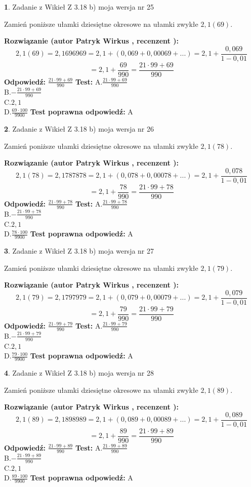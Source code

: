 \documentclass[12pt, a4paper]{article}
\theoremstyle{definition} %
\newtheorem{zad}{}
\newcommand{\zadStart}[1]{\begin{zad}#1\newline}
\newcommand{\zadStop}{\end{zad}}
\newcommand{\rozwStart}[2]{\noindent \textbf{Rozwiązanie (autor #1 , recenzent #2): }\newline}
\newcommand{\rozwStop}{\newline}
\newcommand{\odpStart}{\noindent \textbf{Odpowiedź:}\newline}
\newcommand{\odpStop}{\newline}
\newcommand{\testStart}{\noindent \textbf{Test:}\newline}
\newcommand{\testStop}{\newline}
\newcommand{\kluczStart}{\noindent \textbf{Test poprawna odpowiedź:}\newline}
\newcommand{\kluczStop}{\newline}
\begin{document}
\zadStart{Zadanie z Wikieł Z 3.18 b) moja wersja nr 25}

Zamień poniższe ułamki dziesiętne okresowe na ułamki zwykłe $2,1(69)$.
\zadStop
\rozwStart{Patryk Wirkus}{}
$$2,1(69)=2,1696969=2,1+(0,069+0,00069+...)=2,1+\frac{0,069}{1-0,01}$$
$$=2,1+\frac{69}{990}=\frac{21\cdot99+69}{990}$$
\rozwStop
\odpStart
$\frac{21\cdot99+69}{990}$
\odpStop
\testStart
A.$\frac{21\cdot99+69}{990}$\\ B.$-\frac{21\cdot99+69}{990}$\\ C.$2,1$\\ D.$\frac{69\cdot100}{9900}$
\testStop
\kluczStart
A
\kluczStop



\zadStart{Zadanie z Wikieł Z 3.18 b) moja wersja nr 26}

Zamień poniższe ułamki dziesiętne okresowe na ułamki zwykłe $2,1(78)$.
\zadStop
\rozwStart{Patryk Wirkus}{}
$$2,1(78)=2,1787878=2,1+(0,078+0,00078+...)=2,1+\frac{0,078}{1-0,01}$$
$$=2,1+\frac{78}{990}=\frac{21\cdot99+78}{990}$$
\rozwStop
\odpStart
$\frac{21\cdot99+78}{990}$
\odpStop
\testStart
A.$\frac{21\cdot99+78}{990}$\\ B.$-\frac{21\cdot99+78}{990}$\\ C.$2,1$\\ D.$\frac{78\cdot100}{9900}$
\testStop
\kluczStart
A
\kluczStop



\zadStart{Zadanie z Wikieł Z 3.18 b) moja wersja nr 27}

Zamień poniższe ułamki dziesiętne okresowe na ułamki zwykłe $2,1(79)$.
\zadStop
\rozwStart{Patryk Wirkus}{}
$$2,1(79)=2,1797979=2,1+(0,079+0,00079+...)=2,1+\frac{0,079}{1-0,01}$$
$$=2,1+\frac{79}{990}=\frac{21\cdot99+79}{990}$$
\rozwStop
\odpStart
$\frac{21\cdot99+79}{990}$
\odpStop
\testStart
A.$\frac{21\cdot99+79}{990}$\\ B.$-\frac{21\cdot99+79}{990}$\\ C.$2,1$\\ D.$\frac{79\cdot100}{9900}$
\testStop
\kluczStart
A
\kluczStop



\zadStart{Zadanie z Wikieł Z 3.18 b) moja wersja nr 28}

Zamień poniższe ułamki dziesiętne okresowe na ułamki zwykłe $2,1(89)$.
\zadStop
\rozwStart{Patryk Wirkus}{}
$$2,1(89)=2,1898989=2,1+(0,089+0,00089+...)=2,1+\frac{0,089}{1-0,01}$$
$$=2,1+\frac{89}{990}=\frac{21\cdot99+89}{990}$$
\rozwStop
\odpStart
$\frac{21\cdot99+89}{990}$
\odpStop
\testStart
A.$\frac{21\cdot99+89}{990}$\\ B.$-\frac{21\cdot99+89}{990}$\\ C.$2,1$\\ D.$\frac{89\cdot100}{9900}$
\testStop
\kluczStart
A
\kluczStop
\end{document}
